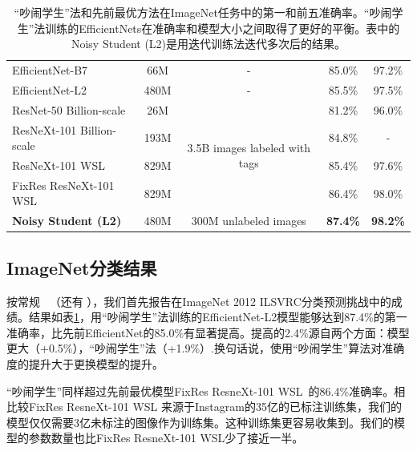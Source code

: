 \documentclass[10pt]{article}
\begin{document}
\begin{table}[h!]
\begin{tabular}{l|cc|cc}
		EfficientNet-B7 \cite{tan2019efficientnet} &  66M  & - & 85.0\% & 97.2\%   \\
		EfficientNet-L2 \cite{tan2019efficientnet} &  480M  & - & 85.5\% & 97.5\%   \\
		\midrule
		ResNet-50 Billion-scale \cite{billion_large_scale} & 26M & \multirow{4}{*}{3.5B images labeled with tags} & 81.2\% & 96.0\% \\
		ResNeXt-101 Billion-scale \cite{billion_large_scale} & 193M &  & 84.8\% & - \\
		ResNeXt-101 WSL \cite{mahajan2018exploring} & 829M &   & 85.4\% & 97.6\% \\
		FixRes ResNeXt-101 WSL \cite{touvron2019fixing} & 829M  &  & 86.4\% &  98.0\%  \\
		\midrule
		\bf Noisy Student (L2) &  480M & 300M unlabeled images & \bf 87.4\% & \bf 98.2\%  \\
		\bottomrule
	\end{tabular}
	\caption{“吵闹学生”法和先前最优方法在ImageNet任务中的第一和前五准确率。“吵闹学生”法训练的EfficientNets在准确率和模型大小之间取得了更好的平衡。表中的Noisy Student (L2)是用迭代训练法迭代多次后的结果。}  
	\label{tab:imagenet}
\end{table}

\subsection{ImageNet分类结果}
按常规~\cite{krizhevsky2012imagenet,szegedy2015going,he2016deep,tan2019efficientnet} （还有 \cite{recht2019imagenet}），我们首先报告在ImageNet 2012 ILSVRC分类预测挑战中的成绩。结果如表\ref{tab:imagenet}，用“吵闹学生”法训练的EfficientNet-L2模型能够达到87.4\%的第一准确率，比先前EfficientNet的85.0\%有显著提高。提高的2.4\%源自两个方面：模型更大（+0.5\%），“吵闹学生”法（+1.9\%）.换句话说，使用“吵闹学生”算法对准确度的提升大于更换模型的提升。  


“吵闹学生”同样超过先前最优模型FixRes ResneXt-101 WSL~\cite{mahajan2018exploring,touvron2019fixing}的86.4\%准确率。相比较FixRes ResneXt-101 WSL 来源于Instagram的35亿的已标注训练集，我们的模型仅仅需要3亿未标注的图像作为训练集。这种训练集更容易收集到。我们的模型的参数数量也比FixRes ResneXt-101 WSL少了接近一半。  
\end{document}
